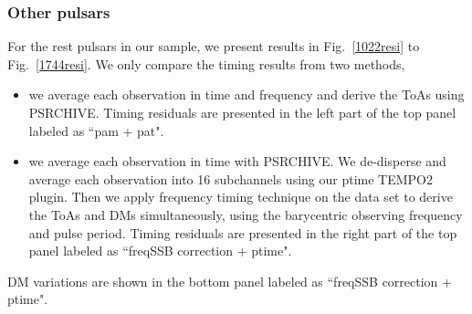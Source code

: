 \documentclass[useAMS,usenatbib]{mn2e}
\begin{document}
\subsubsection{Other pulsars}

For the rest pulsars in our sample, we present results in Fig.~\ref{1022resi} 
to Fig.~\ref{1744resi}. We only compare the timing results from two methods,
\begin{itemize}
\item we average each observation in time and frequency and derive the ToAs using 
PSRCHIVE. Timing residuals are presented in the left part of the top panel 
labeled as ``pam + pat".
\item we average each observation in time with PSRCHIVE. We de-disperse 
and average each observation into 16 subchannels using our ptime TEMPO2 plugin. 
Then we apply frequency timing technique on the data set to derive the ToAs 
and DMs simultaneously, using the barycentric observing frequency and pulse period. 
Timing residuals are presented in the right part of the top panel
labeled as ``freqSSB correction + ptime".
\end{itemize}
DM variations are shown in the bottom panel labeled as ``freqSSB correction + ptime". 

\end{document}
